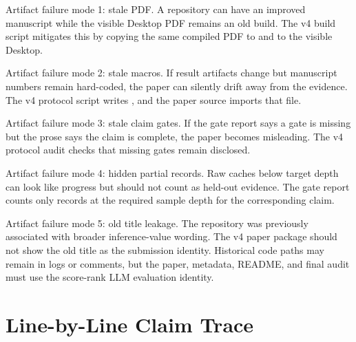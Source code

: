 Artifact failure mode 1: stale PDF. A repository can have an improved
manuscript while the visible Desktop PDF remains an old build. The v4 build
script mitigates this by copying the same compiled PDF to
 and to the visible Desktop.

Artifact failure mode 2: stale macros. If result artifacts change but
manuscript numbers remain hard-coded, the paper can silently drift away from
the evidence. The v4 protocol script writes , and the
paper source imports that file.

Artifact failure mode 3: stale claim gates. If the gate report says a gate is
missing but the prose says the claim is complete, the paper becomes
misleading. The v4 protocol audit checks that missing gates remain disclosed.

Artifact failure mode 4: hidden partial records. Raw caches below target depth
can look like progress but should not count as held-out evidence. The gate
report counts only records at the required sample depth for the corresponding
claim.

Artifact failure mode 5: old title leakage. The repository was previously
associated with broader inference-value wording. The v4 paper package should
not show the old title as the submission identity. Historical code paths may
remain in logs or comments, but the paper, metadata, README, and final audit
must use the score-rank LLM evaluation identity.

\section{Line-by-Line Claim Trace}
\label{app:claim-trace}

